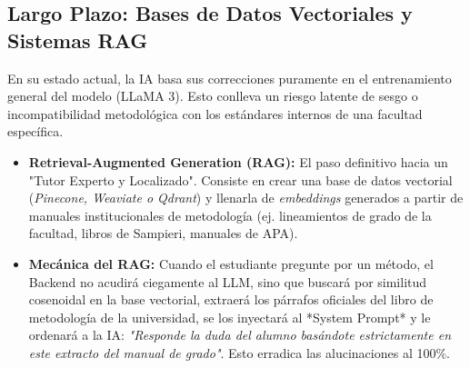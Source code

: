 \subsection{Largo Plazo: Bases de Datos Vectoriales y Sistemas RAG}
En su estado actual, la IA basa sus correcciones puramente en el entrenamiento general del modelo (LLaMA 3). Esto conlleva un riesgo latente de sesgo o incompatibilidad metodológica con los estándares internos de una facultad específica.
\begin{itemize}
    \item \textbf{Retrieval-Augmented Generation (RAG):} El paso definitivo hacia un "Tutor Experto y Localizado". Consiste en crear una base de datos vectorial (\textit{Pinecone, Weaviate o Qdrant}) y llenarla de \textit{embeddings} generados a partir de manuales institucionales de metodología (ej. lineamientos de grado de la facultad, libros de Sampieri, manuales de APA).
    \item \textbf{Mecánica del RAG:} Cuando el estudiante pregunte por un método, el Backend no acudirá ciegamente al LLM, sino que buscará por similitud cosenoidal en la base vectorial, extraerá los párrafos oficiales del libro de metodología de la universidad, se los inyectará al *System Prompt* y le ordenará a la IA: \textit{"Responde la duda del alumno basándote estrictamente en este extracto del manual de grado"}. Esto erradica las alucinaciones al 100\%.
\end{itemize}
